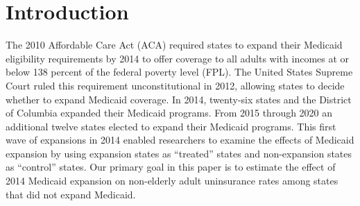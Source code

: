 \documentclass[aoas]{imsart}
\theoremstyle{plain}
\theoremstyle{remark}
\begin{document}
\begin{frontmatter}
\begin{keyword}
\end{keyword}

\end{frontmatter}


\section{Introduction}

The 2010 Affordable Care Act (ACA) required states to expand their Medicaid eligibility requirements by 2014 to offer coverage to all adults with incomes at or below 138 percent of the federal poverty level (FPL). The United States Supreme Court ruled this requirement unconstitutional in 2012, allowing states to decide whether to expand Medicaid coverage. In 2014, twenty-six states and the District of Columbia expanded their Medicaid programs. From 2015 through 2020 an additional twelve states elected to expand their Medicaid programs. This first wave of expansions in 2014 enabled researchers to examine the effects of Medicaid expansion by using expansion states as ``treated'' states and non-expansion states as ``control'' states. Our primary goal in this paper is to estimate the effect of 2014 Medicaid expansion on non-elderly adult uninsurance rates among states that did not expand Medicaid.
\end{document}
